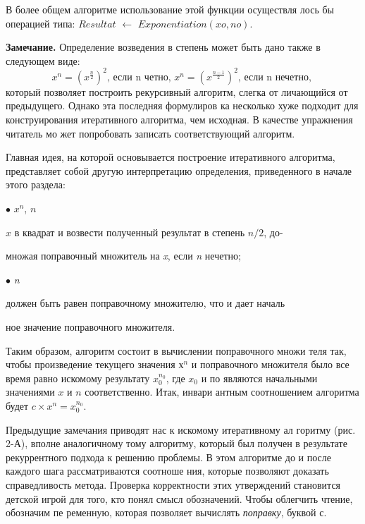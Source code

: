 \parindent=1cm В более общем алгоритме использование этой функции осуществля­
лось бы операцией типа: \textit{$Resultat$} $\leftarrow$ \textit{$Exponentiation(xo,no)$}.
\newline
\begin{center}
\parbox{11cm}
{
\textbf{Замечание.} Определение возведения в степень может быть дано
также в следующем виде:
\begin{equation*}
x^{n} = (x^{ \frac{n}{2} }) ^ {2} \text{, если n четно, } x^{n} = (x^{ \frac{n-1}{2} }) ^ {2}  \text{, если n нечетно, }
\end{equation*}
который позволяет построить рекурсивный алгоритм, слегка от­
личающийся от предыдущего. Однако эта последняя формулиров­
ка несколько хуже подходит для конструирования итеративного
алгоритма, чем исходная. В качестве упражнения читатель мо­
жет попробовать записать соответствующий алгоритм.
}
\end{center}
\parindent=1cm Главная идея, на которой основывается построение итеративного
алгоритма, представляет собой другую интерпретацию определения,
приведенного в начале этого раздела:

\parindent=1cm $\bullet$  \textit{$x^{n}$},  \textit{$n$} 

\parindent=1cm  \textit{$x$} в квадрат и возвести полученный результат в степень \textit{$n/2$}, до-

\parindent=1cm множая поправочный множитель на \textit{x}, если \textit{n} нечетно;

\parindent=1cm $\bullet$  \textit{n} 

\parindent=1cm должен быть равен поправочному множителю, что и дает началь­

\parindent=1cm ное значение поправочного множителя.

\noindent Таким образом, алгоритм состоит в вычислении поправочного множи­
теля так, чтобы произведение текущего значения \textit{$х^{n}$} и поправочного
множителя было все время равно искомому результату \textit{$x_{0}^{n_{0}}$}, где \textit{$x_{0}$} и по
являются начальными значениями \textit{$x$} и \textit{$n$} соответственно. Итак, инвари­
антным соотношением алгоритма будет \textit{$c \times x^{n} = x_0^{n_0}$}.
\pagebreak

Предыдущие замечания приводят нас к искомому итеративному ал­
горитму (рис. 2-А), вполне аналогичному тому алгоритму, который был 
получен  в  результате  рекуррентного  подхода к  решению  проблемы.  В 
этом  алгоритме до  и  после  каждого шага рассматриваются соотноше­
ния,  которые  позволяют  доказать  справедливость  метода.  Проверка 
корректности  этих  утверждений  становится  детской  игрой  для  того, 
кто понял смысл обозначений.  Чтобы облегчить чтение,  обозначим пе­
ременную,  которая позволяет вычислять 
\textit{поправку}, буквой  с.

